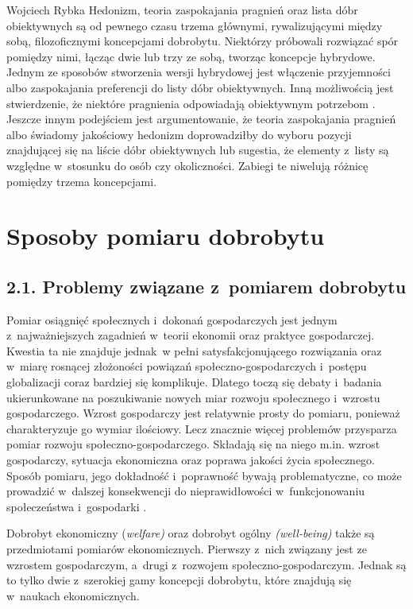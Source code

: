\begin{artplenv}{Wojciech Rybka}
Hedonizm, teoria zaspokajania pragnień oraz lista dóbr obiektywnych są od pewnego czasu trzema głównymi, rywalizującymi
między sobą, filozoficznymi koncepcjami dobrobytu. Niektórzy próbowali rozwiązać spór pomiędzy nimi, łącząc dwie lub
trzy ze sobą, tworząc koncepcje hybrydowe. Jednym ze sposobów stworzenia wersji hybrydowej jest włączenie przyjemności
albo zaspokajania preferencji do listy dóbr obiektywnych. Inną możliwością jest stwierdzenie, że niektóre pragnienia
odpowiadają obiektywnym potrzebom
\parencite{hamilton_political_2003}.
Jeszcze innym podejściem jest
argumentowanie, że teoria zaspokajania pragnień albo świadomy jakościowy hedonizm doprowadziłby do wyboru pozycji
znajdującej się na liście dóbr obiektywnych lub sugestia, że elementy z~listy są względne w~stosunku do osób czy
okoliczności. Zabiegi te niwelują różnicę pomiędzy trzema koncepcjami.

\section{Sposoby pomiaru dobrobytu}
\baselineskip
\subsection{2.1. Problemy związane z~pomiarem dobrobytu}
Pomiar osiągnięć społecznych i~dokonań gospodarczych jest jednym z~najważniejszych zagadnień w~teorii ekonomii oraz
praktyce gospodarczej. Kwestia ta nie znajduje jednak~w pełni satysfakcjonującego rozwiązania oraz w~miarę rosnącej
złożoności powiązań społeczno-gospodarczych i~postępu globalizacji coraz bardziej się komplikuje. Dlatego toczą się
debaty  i~badania ukierunkowane na poszukiwanie nowych miar rozwoju społecznego i~wzrostu gospodarczego. Wzrost
gospodarczy jest relatywnie prosty do pomiaru, ponieważ charakteryzuje go wymiar ilościowy. Lecz znacznie więcej
problemów przysparza pomiar rozwoju społeczno-gospodarczego. Składają się na niego m.in. wzrost gospodarczy, sytuacja
ekonomiczna oraz poprawa jakości życia społecznego. Sposób pomiaru, jego dokładność i~poprawność bywają problematyczne,
co może prowadzić w~dalszej konsekwencji do nieprawidłowości w~funkcjonowaniu społeczeństwa i~gospodarki
\parencite{cieslik_dylemat_2014}.

Dobrobyt ekonomiczny (\textit{welfare) }oraz dobrobyt ogólny \textit{(well-being) }także są przedmiotami pomiarów
ekonomicznych. Pierwszy z~nich związany jest ze wzrostem gospodarczym, a~drugi z~rozwojem społeczno-gospodarczym.
Jednak są to tylko dwie z~szerokiej gamy koncepcji dobrobytu, które znajdują się w~naukach ekonomicznych.


\end{artplenv}

